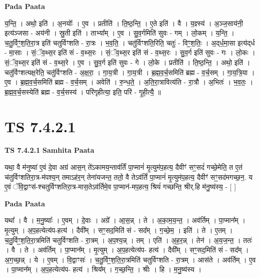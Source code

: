 \documentclass[17pt]{extarticle}
\begin{document}
\textbf{Pada Paata} \newline

य॒न्ति॒ । अथो॒ इति॑ । अ॒नयोः᳚ । ए॒व । प्रतीति॑ । ति॒ष्ठ॒न्ति॒ । ए॒ते इति॑ । वै । य॒ज्ञ्स्य॑ । अ॒ञ्ज॒साय॑नी॒ इत्य॑ञ्जसा - अय॑नी । स्रु॒ती इति॑ । ताभ्या᳚म् । ए॒व । सु॒व॒र्गमिति॑ सुवः - गम् । लो॒कम् । य॒न्ति॒ । च॒तु॒र्विꣳ॒॒श॒ति॒रा॒त्र इति॑ चतुर्विꣳशति - रा॒त्रः । भ॒व॒ति॒ । चतु॑र्विꣳशति॒रिति॒ चतुः॑ - विꣳ॒॒श॒तिः॒ । अ॒द्‌र्ध॒मा॒सा इत्य॑द्‌र्ध - मा॒साः । सं॒ॅव॒थ्स॒र इति॑ सं - व॒थ्स॒रः । सं॒ॅव॒थ्स॒र इति॑ सं - व॒थ्स॒रः । सु॒व॒र्ग इति॑ सुवः - गः । लो॒कः । सं॒ॅव॒थ्स॒र इति॑ सं - व॒थ्स॒रे । ए॒व । सु॒व॒र्ग इति॑ सुवः - गे । लो॒के । प्रतीति॑ । ति॒ष्ठ॒न्ति॒ । अथो॒ इति॑ । चतु॑र्विꣳशत्यक्ष॒रेति॒ चतु॑र्विꣳशति - अ॒क्ष॒रा॒ । गा॒य॒त्री । गा॒य॒त्री । ब्र॒ह्म॒व॒र्च॒समिति॑ ब्रह्म - व॒र्च॒सम् । गा॒य॒त्रि॒या । ए॒व । ब्र॒ह्म॒व॒र्च॒समिति॑ ब्रह्म - व॒र्च॒सम् । अवेति॑ । रु॒न्ध॒ते॒ । अ॒ति॒रा॒त्रावित्य॑ति - रा॒त्रौ । अ॒भितः॑ । भ॒व॒तः॒ । ब्र॒ह्म॒व॒र्च॒सस्येति॑ ब्रह्म - व॒र्च॒सस्य॑ । परि॑गृहीत्या॒ इति॒ परि॑ - गृ॒ही॒त्यै॒ ॥  \newline




\section*{ TS 7.4.2.1 }

\textbf{TS 7.4.2.1 } \newline
\textbf{Samhita Paata} \newline

यथा॒ वै म॑नुष्या॑ ए॒वं दे॒वा अग्र॑ आस॒न् ते॑ऽकामय॒न्ताव॑र्तिं पा॒प्मानं॑ मृ॒त्युम॑प॒हत्य॒ दैवीꣳ॑ सꣳ॒॒सदं॑ गच्छे॒मेति॒ त ए॒तं च॑तुर्विꣳशतिरा॒त्र-म॑पश्य॒न् तमाऽह॑र॒न् तेना॑यजन्त॒ ततो॒ वै तेऽव॑र्तिं पा॒प्मानं॑ मृ॒त्युम॑प॒हत्य॒ दैवीꣳ॑ सꣳ॒॒सद॑मगच्छ॒न॒. य ए॒वं ॅवि॒द्वाꣳस॑-श्चतुर्विꣳशतिरा॒त्र-मास॒तेऽव॑र्तिमे॒व पा॒प्मान॑-मप॒हत्य॒ श्रियं॑ गच्छन्ति॒ श्रीर्.हि म॑नु॒ष्य॑स्य॒ - [  ] \newline

\textbf{Pada Paata} \newline

यथा᳚ । वै । म॒नु॒ष्याः᳚ । ए॒वम् । दे॒वाः । अग्रे᳚ । आ॒स॒न्न् । ते । अ॒का॒म॒य॒न्त॒ । अव॑र्तिम् । पा॒प्मान᳚म् । मृ॒त्युम् । अ॒प॒हत्येत्य॑प-हत्य॑ । दैवी᳚म् । सꣳ॒॒सद॒मिति॑ सं - सद᳚म् । ग॒च्छे॒म॒ । इति॑ । ते । ए॒तम् । च॒तु॒र्विꣳ॒॒श॒ति॒रा॒त्रमिति॑ चतुर्विꣳशति - रा॒त्रम् । अ॒प॒श्य॒न्न् । तम् । एति॑ । अ॒ह॒र॒न्न् । तेन॑ । अ॒य॒ज॒न्त॒ । ततः॑ । वै । ते । अव॑र्तिम् । पा॒प्मान᳚म् । मृ॒त्युम् । अ॒प॒हत्येत्य॑प- हत्य॑ । दैवी᳚म् । सꣳ॒॒सद॒मिति॑ सं - सद᳚म् । अ॒ग॒च्छ॒न्न् । ये । ए॒वम् । वि॒द्वाꣳसः॑ । च॒तु॒र्विꣳ॒॒श॒ति॒रा॒त्रमिति॑ चतुर्विꣳशति - रा॒त्रम् । आस॑ते । अव॑र्तिम् । ए॒व । पा॒प्मान᳚म् । अ॒प॒हत्येत्य॑प- हत्य॑ । श्रिय᳚म् । ग॒च्छ॒न्ति॒ । श्रीः । हि । म॒नु॒ष्य॑स्य ।  \newline
\end{document}
